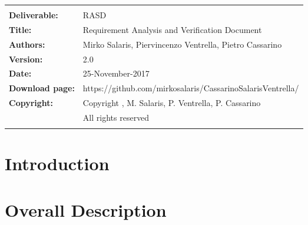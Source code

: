
 




\begin{table}[h!]
\begin{tabu} to \textwidth { X[0.3,r,p] X[0.7,l,p] }
\hline
\smallskip & \smallskip\\
\textbf{Deliverable:} & RASD\\
\textbf{Title:} & Requirement Analysis and Verification Document \\
\textbf{Authors:} & Mirko Salaris, Piervincenzo Ventrella, Pietro Cassarino \\
\textbf{Version:} & 2.0 \\
\textbf{Date:} & 25-November-2017 \\
\textbf{Download page:} & https://github.com/mirkosalaris/CassarinoSalarisVentrella/\\
\textbf{Copyright:} & Copyright , M. Salaris, P. Ventrella, P. Cassarino\\
\hfill & All rights reserved \\
\smallskip & \smallskip\\
\hline
\end{tabu}
\end{table}

\newpage
\renewcommand{\contentsname}{Table of Contents} %
{\hypersetup{hidelinks}
\tableofcontents
\listoffigures
}

\clearpage
\section{Introduction}
\label{sect:introduction}


\clearpage
\section{Overall Description}
\label{sect:overview}


